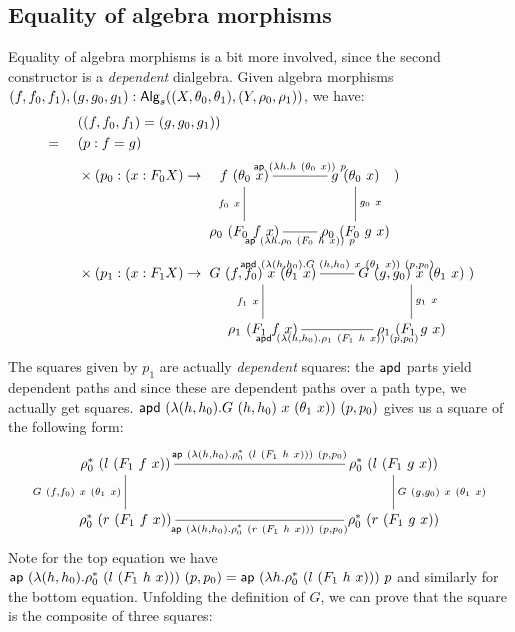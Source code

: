 \documentclass[a4paper,10pt]{report}
\begin{document}
\subsection{Equality of algebra morphisms}
Equality of algebra morphisms is a bit more involved, since the second
constructor is a \emph{dependent} dialgebra. Given algebra morphisms
$(f,f_0,f_1), (g,g_0,g_1) :
\mathsf{Alg}_s((X,\theta_0,\theta_1),(Y,\rho_0,\rho_1))$, we have:
%
\begin{align*}
  & &&\ ((f,f_0,f_1) = (g,g_0,g_1)) \\
  &=&&\ (p : f = g) \\
  & &&\ \times (p_0 : (x : F_0 X) \to 
  \xymatrix{
    f\ (\theta_0\ x) \ar@{-}[d]_{f_0\ x} \ar@{-}[r]^{\ap\ (\lambda h . h\ (\theta_0\ x))\ p}  &g\ (\theta_0\ x) \ar@{-}[d]^{g_0\ x} \\
    \rho_0\ (F_0\ f\ x) \ar@{-}[r]_{\ap\ (\lambda h . \rho_0\ (F_0\ h\ x))\ p} &\rho_0\ (F_0\ g\ x)
  }) \\
  & &&\ \times (p_1 : (x : F_1 X) \to
  \xymatrix{
    G\ (f,f_0)\ x\ (\theta_1\ x) \ar@{-}[d]_{f_1\ x} \ar@{-}[r]^{\apd\ (\lambda (h,h_0) . G\ (h,h_0)\ x\ (\theta_1\ x))\ (p,p_0)}  &G\ (g,g_0)\ x\ (\theta_1\ x) \ar@{-}[d]^{g_1\ x} \\
    \rho_1\ (F_1\ f\ x) \ar@{-}[r]_{\apd\ (\lambda (h,h_0) . \rho_1\ (F_1\ h\ x))\ (p,p_0)} &\rho_1\ (F_1\ g\ x)
  }) \\
\end{align*}
%
The squares given by $p_1$ are actually \emph{dependent} squares: the
$\mathsf{apd}$ parts yield dependent paths and since these are dependent paths
over a path type, we actually get squares.
$\apd\ (\lambda (h,h_0) . G\ (h,h_0)\ x\ (\theta_1\ x))\ (p,p_0)$
gives us a square of the following form:
$$
\xymatrixcolsep{10pc}
\xymatrix{
  \rho_0^*\ (l\ (F_1\ f\ x))
  \ar@{-}[d]_{G\ (f,f_0)\ x\ (\theta_1\ x)}
  \ar@{-}[r]^{\ap\ (\lambda (h,h_0) . \rho_0^*\ (l\ (F_1\ h\ x)))\ (p,p_0)}
  &\rho_0^*\ (l\ (F_1\ g\ x)) 
  \\
  \rho_0^*\ (r\ (F_1\ f\ x))
  &\rho_0^*\ (r\ (F_1\ g\ x)) 
  \ar@{-}[l]^{\ap\ (\lambda (h,h_0) . \rho_0^*\ (r\ (F_1\ h\ x)))\ (p,p_0)}
  \ar@{-}[u]_{G\ (g,g_0)\ x\ (\theta_1\ x)}
  \\
}
$$
Note for the top equation we have
$\ap\ (\lambda (h,h_0) . \rho_0^*\ (l\ (F_1\ h\ x)))\ (p,p_0) = \ap\
(\lambda h . \rho_0^*\ (l\ (F_1\ h\ x)))\ p$
and similarly for the bottom equation. Unfolding the definition of
$G$, we can prove that the square is the composite of three squares:
\end{document}
